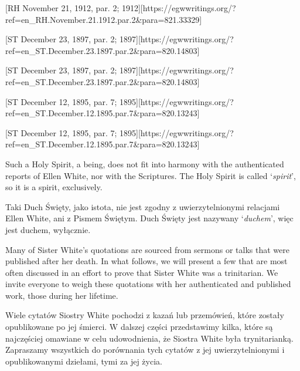 [RH November 21, 1912, par. 2; 1912][https://egwwritings.org/?ref=en\_RH.November.21.1912.par.2&para=821.33329]


[ST December 23, 1897, par. 2; 1897][https://egwwritings.org/?ref=en\_ST.December.23.1897.par.2&para=820.14803]


[ST December 23, 1897, par. 2; 1897][https://egwwritings.org/?ref=en\_ST.December.23.1897.par.2&para=820.14803]


[ST December 12, 1895, par. 7; 1895][https://egwwritings.org/?ref=en\_ST.December.12.1895.par.7&para=820.13243]


[ST December 12, 1895, par. 7; 1895][https://egwwritings.org/?ref=en\_ST.December.12.1895.par.7&para=820.13243]


Such a Holy Spirit, a being, does not fit into harmony with the authenticated reports of Ellen White, nor with the Scriptures. The Holy Spirit is called ‘\textit{spirit}’, so it is a spirit, exclusively.


Taki Duch Święty, jako istota, nie jest zgodny z uwierzytelnionymi relacjami Ellen White, ani z Pismem Świętym. Duch Święty jest nazywany ‘\textit{duchem}’, więc jest duchem, wyłącznie.


Many of Sister White’s quotations are sourced from sermons or talks that were published after her death. In what follows, we will present a few that are most often discussed in an effort to prove that Sister White was a trinitarian. We invite everyone to weigh these quotations with her authenticated and published work, those during her lifetime.


Wiele cytatów Siostry White pochodzi z kazań lub przemówień, które zostały opublikowane po jej śmierci. W dalszej części przedstawimy kilka, które są najczęściej omawiane w celu udowodnienia, że Siostra White była trynitarianką. Zapraszamy wszystkich do porównania tych cytatów z jej uwierzytelnionymi i opublikowanymi dziełami, tymi za jej życia.


